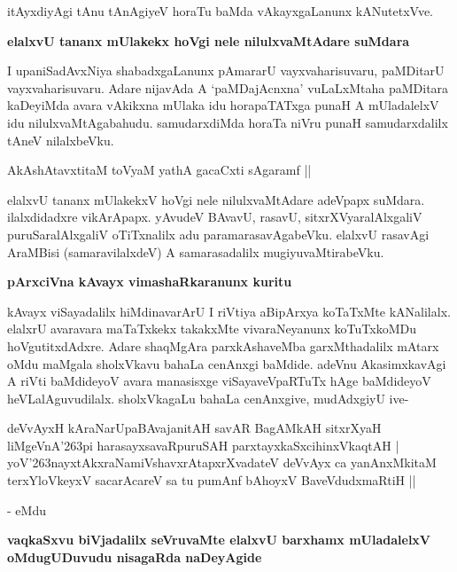 \noindent
itAyxdiyAgi tAnu tAnAgiyeV horaTu baMda vAkayxgaLanunx kANutetxVve.

{\bigskip
\noindent
{\large\bf elalxvU tananx mUlakekx hoVgi nele nilulxvaMtAdare suMdara}}\label{page246}
\medskip

\noindent
I upaniSadAvxNiya shabadxgaLanunx pAmararU vayxvaharisuvaru, paMDitarU vayxvaharisuvaru. Adare nijavAda A `paMDajAcnxna' vuLaLxMtaha paMDitara kaDeyiMda avara vAkikxna mUlaka idu horapaTATxga punaH A mUladalelxV idu nilulxvaMtAgabahudu. samudarxdiMda horaTa niVru punaH samudarxdalilx tAneV nilalxbeVku.

\begin{shloka}
AkAshAtavxtitaM toVyaM yathA gacaCxti sAgaramf ||\label{247}
\end{shloka}

elalxvU tananx mUlakekxV hoVgi nele nilulxvaMtAdare adeVpapx suMdara. ilalxdidadxre vikArApapx. yAvudeV BAvavU, rasavU, sitxrXVyaralAlxgaliV puruSaralAlxgaliV oTiTxnalilx adu paramarasavAgabeVku. elalxvU rasavAgi AraMBisi (samaravilalxdeV) A samarasadalilx mugiyuvaMtirabeVku.

{\medskip
\noindent
{\large\bf pArxciVna kAvayx vimashaRkaranunx kuritu}}
\smallskip

\noindent
kAvayx viSayadalilx hiMdinavarArU I riVtiya aBipArxya koTaTxMte kANalilalx. elalxrU avaravara maTaTxkekx takakxMte vivaraNeyanunx koTuTxkoMDu hoVgutitxdAdxre. Adare shaqMgAra parxkAshaveMba garxMthadalilx mAtarx oMdu maMgala sholxVkavu bahaLa cenAnxgi baMdide. adeVnu AkasimxkavAgi A riVti baMdideyoV avara manasisxge viSayaveVpaRTuTx hAge baMdideyoV heVLalAguvudilalx. sholxVkagaLu bahaLa cenAnxgive, mudAdxgiyU ive-

\begin{shloka}
deVvAyxH kAraNarUpaBAvajanitAH savAR BagAMkAH sitxrXyaH\\\label{247a}
liMgeVnA\char'263pi harasayxsavaRpuruSAH parxtayxkaSxcihinxVkaqtAH |\\
yoV\char'263nayxtAkxraNamiVshavxrAtapxrXvadateV deVvAyx ca yanAnxMkitaM \\
terxYloVkeyxV sacarAcareV sa tu pumAnf bAhoyxV BaveVdudxmaRtiH || 
\end{shloka}
\noindent
- eMdu

{\bigskip
\noindent
{\large\bf vaqkaSxvu biVjadalilx seVruvaMte elalxvU barxhamx mUladalelxV oMdugUDuvudu nisagaRda naDeyAgide}}\label{page247}
\medskip


